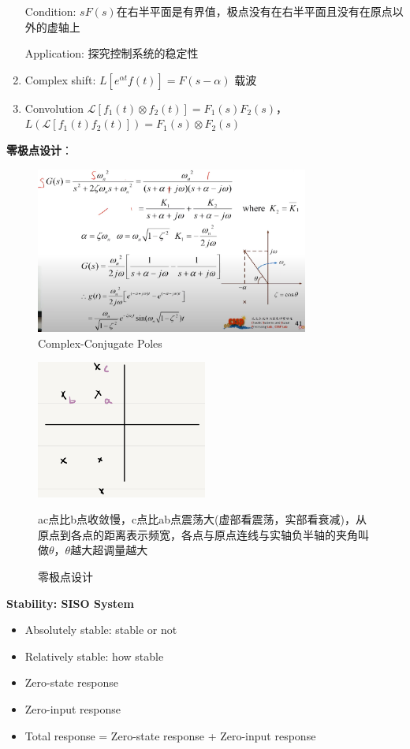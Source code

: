 \documentclass[main.tex]{subfiles}
\begin{document}
\begin{enumerate}
    Condition: $sF(s)$在右半平面是有界值，极点没有在右半平面且没有在原点以外的虚轴上
    
    Application: 探究控制系统的稳定性

    \item Complex shift: $L[e^{\alpha t}f(t)] = F(s-\alpha)$   载波

    \item Convolution $\mathcal{L}[f_1(t)\otimes f_2(t)] = F_1(s)F_2(s)$，$L(\mathcal{L}[f_1(t)f_2(t)]) = F_1(s)\otimes F_2(s)$
\end{enumerate}

\textbf{零极点设计}：
\begin{figure}[H]
    \centering
    \includegraphics[width=0.8\textwidth]{img/img_2.1.3.png}
    \caption{Complex-Conjugate Poles}
    \label{Complex-Conjugate Poles}
\end{figure}
\begin{figure}[H]
\begin{minipage}{0.5\textwidth}
    \centering
    \includegraphics[width=0.5\textwidth]{img/img_2.1.2.png}
    \caption{零极点设计}
    \label{fig:zero-pole design}
\end{minipage}
\hfill
\begin{minipage}{0.5\textwidth}
    ac点比b点收敛慢，c点比ab点震荡大(虚部看震荡，实部看衰减)，从原点到各点的距离表示频宽，各点与原点连线与实轴负半轴的夹角叫做$\theta$，$\theta$越大超调量越大
\end{minipage}
\end{figure}

\textbf{Stability: SISO System}
\begin{itemize}
    \item Absolutely stable: stable or not
    \item Relatively stable: how stable
    \item Zero-state response
    \item Zero-input response
    \item Total response = Zero-state response + Zero-input response
\end{itemize}
\end{document}
